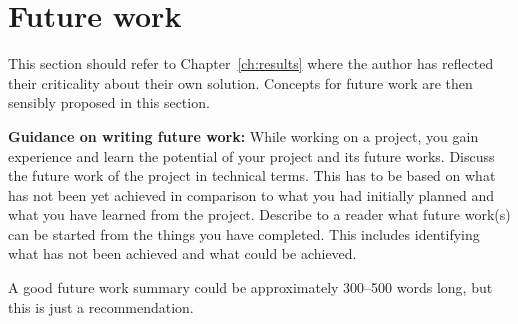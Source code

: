 \section{Future work}
This section should refer to Chapter~\ref{ch:results} where the author has reflected their criticality about their own solution. Concepts for future work are then sensibly proposed in this section.

\textbf{Guidance on writing future work:} While working on a project, you gain experience and learn the potential of your project and its future works. Discuss the future work of the project in technical terms. This has to be based on what has not been yet achieved in comparison to what you had initially planned and what you have learned from the project. Describe to a reader what future work(s) can be started from the things you have completed. This includes identifying what has not been achieved and what could be achieved. 



A good future work summary could be approximately 300--500 words long, but this is just a recommendation.
